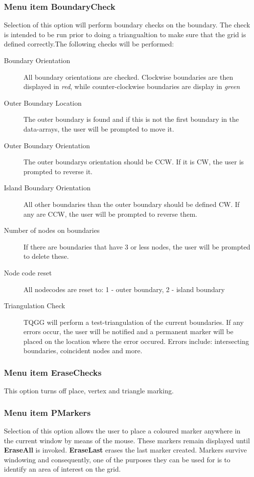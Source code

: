 \documentclass{article}
\begin{document}
\subsubsection{Menu item BoundaryCheck}
Selection of this option will perform boundary checks on the boundary. The check is intended to be run prior to doing a triangualtion to make sure that the grid is defined correctly.The following checks will be performed:
\begin{description}
\item[Boundary Orientation] All boundary orientations are checked. Clockwise boundaries are then displayed in \emph{red}, while counter-clockwise boundaries are display in \emph{green}
\item[Outer Boundary Location] The outer boundary is found and if this is not the first boundary in the data-arrays, the user will be prompted to move it.
\item[Outer Boundary Orientation] The outer boundarys orientation should be CCW. If it is CW, the user is prompted to reverse it.
\item[Island Boundary Orientation] All other boundaries than the outer boundary should be defined CW. If any are CCW, the user will be prompted to reverse them.
\item[Number of nodes on boundaries] If there are boundaries that have 3 or less nodes, the user will be prompted to delete these.
\item[Node code reset] All nodecodes are reset to: 1 - outer boundary, 2 - island boundary
\item[Triangulation Check] TQGG will perform a test-triangulation of the current boundaries. If any errors occur, the user will be notified and a permanent marker will be placed on the location where the error occured. Errors include: intersecting boundaries, coincident nodes and more.
\end{description}

\subsubsection{Menu item EraseChecks}
This option turns off place, vertex and triangle marking.

\subsubsection{Menu item PMarkers}
Selection of this option allows the user to place a coloured marker anywhere in the current window by means of the mouse. These markers remain displayed until \textbf{EraseAll} is invoked. \textbf{EraseLast} erases the last marker created. Markers survive windowing and consequently, one of the purposes they can be used for is to identify an area of interest on the grid.
\end{document}
